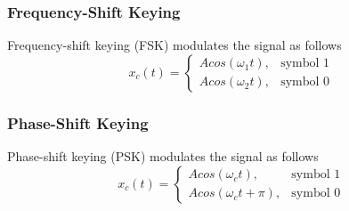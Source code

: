 \documentclass[]{article}
\begin{document}
\subsubsection{Frequency-Shift Keying}
Frequency-shift keying (FSK) modulates the signal as follows
\begin{equation} x_{c}(t)=\begin{cases}Acos(\omega_{1}t), & \text{symbol 1} \\
Acos(\omega_{2}t), & \text{symbol 0}
\end{cases} \end{equation}
\subsubsection{Phase-Shift Keying}
Phase-shift keying (PSK) modulates the signal as follows
\begin{equation} x_{c}(t)=\begin{cases}Acos(\omega_{c}t), & \text{symbol 1} \\
Acos(\omega_{c}t+\pi), & \text{symbol 0}
\end{cases} \end{equation}
\end{document}
